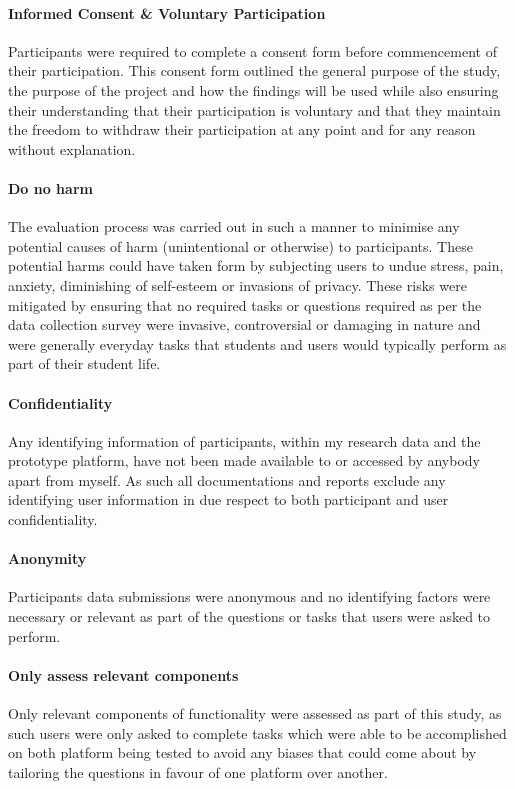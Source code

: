 \documentclass[lettersize,journal]{IEEEtran}
\begin{document}
		\paragraph{Informed Consent \& Voluntary Participation}

		Participants were required to complete a consent form before commencement of their participation. This consent form outlined the general purpose
		of the study, the purpose of the project and how the findings will be used while also ensuring their understanding that their participation is
		voluntary and that they maintain the freedom to withdraw their participation at any point and for any reason without explanation.
       
      		 \paragraph{Do no harm}
       		The evaluation process was carried out in such a manner to minimise any potential causes of harm (unintentional or otherwise) to participants.
		These potential harms could have taken form by subjecting users to undue stress, pain, anxiety, diminishing of self-esteem or invasions of privacy.
		These risks were mitigated by ensuring that no required tasks or questions required as per the data collection survey were invasive, controversial
		or damaging in nature and were generally everyday tasks that students and users would typically perform as part of their student life.

		\paragraph{Confidentiality}
		Any identifying information of participants, within my research data and the prototype platform, have not been made available to or accessed
		by anybody apart from myself. As such all documentations and reports exclude any identifying user information in due respect to both participant
		and user confidentiality.

       		\paragraph{Anonymity}

       		Participants data submissions were anonymous and no identifying factors were necessary or relevant as part of the questions or tasks that users 
		were asked to perform.

		\paragraph{Only assess relevant components}
		Only relevant components of functionality were assessed as part of this study, as such users were only asked to complete tasks which were able to be
		accomplished on both platform being tested to avoid any biases that could come about by tailoring the questions in favour of one platform over 
		another.                
\end{document}
